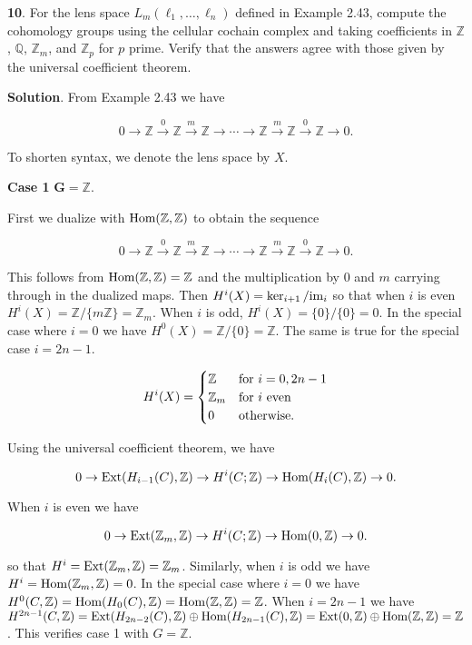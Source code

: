 \documentclass{article}
\newcommand{\Z}{\mathbb{Z}}
\newcommand{\Q}{\mathbb{Q}}
\newcommand{\Hom}{\textnormal{Hom}}
\newcommand{\Ext}{\textnormal{Ext}}
\newcommand{\im}{\textnormal{im}}
\begin{document}
\textbf{10}. For the lens space $L_{m}(\ell_{1}, \ldots, \ell_{n})$ defined in Example 2.43, compute the cohomology groups using the cellular cochain complex and taking coefficients in $\Z$, $\Q$, $\Z_{m}$, and $\Z_{p}$ for $p$ prime. Verify that the answers agree with those given by the universal coefficient theorem.
\medskip

\textbf{Solution}. From Example 2.43 we have

$$0\to \Z\xrightarrow{0} \Z\xrightarrow{m} \Z\to \cdots \to \Z \xrightarrow{m}\Z \xrightarrow{0}\Z\to 0.$$

To shorten syntax, we denote the lens space by $X$.
\bigskip

\textbf{Case 1} $\mathbf{G = \Z}$.

First we dualize with $\Hom(\Z, \Z)$ to obtain the sequence

$$0\to \Z\xrightarrow{0} \Z\xrightarrow{m} \Z\to \cdots \to \Z \xrightarrow{m}\Z \xrightarrow{0}\Z\to 0.$$

This follows from $\Hom(\Z, \Z) = \Z$ and the multiplication by 0 and $m$ carrying through in the dualized maps. Then $H^{i}(X) = \ker_{i+1}/\im_{i}$ so that when $i$ is even $H^{i}(X) = \Z/\{m\Z\} = \Z_{m}$. When $i$ is odd, $H^{i}(X) = \{0\}/\{0\} = 0$. In the special case where $i = 0$ we have $H^{0}(X) = \Z/\{0\} = \Z$. The same is true for the special case $i = 2n-1$.

\[H^{i}(X) = \begin{cases} \Z & \textnormal{for } i=0, 2n-1\\
\Z_{m} & \textnormal{for } i\textnormal{ even}\\
0 & \textnormal{otherwise}. \end{cases}\]
\medskip

Using the universal coefficient theorem, we have

$$0\to \Ext(H_{i-1}(C), \Z)\to H^{i}(C;\Z)\to \Hom(H_{i}(C),\Z)\to 0.$$

When $i$ is even we have

$$0\to \Ext(\Z_{m}, \Z)\to H^{i}(C;\Z)\to \Hom(0,\Z)\to 0.$$

so that $H^{i} = \Ext(\Z_{m},\Z) = \Z_{m}$. Similarly, when $i$ is odd we have $H^{i} = \Hom(\Z_{m},\Z) = 0$. In the special case where $i = 0$ we have $H^{0}(C, \Z) = \Hom(H_{0}(C), \Z) = \Hom(\Z, \Z) = \Z$. When $i = 2n-1$ we have $H^{2n-1}(C, \Z) = \Ext(H_{2n-2}(C), \Z)\oplus\Hom(H_{2n-1}(C), \Z) = \Ext(0, \Z)\oplus\Hom(\Z, \Z) = \Z$. This verifies case 1 with $G = \Z$.
\bigskip
\end{document}

